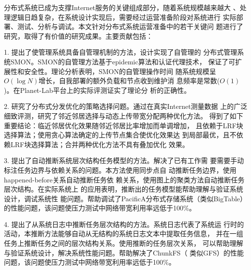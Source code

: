 \begin{cabstract}


  分布式系统已成为支撑Internet服务的关键组成部分，随着系统规模越来越大
  、处理逻辑日趋复杂，在系统设计实现后，需要经过运营准备阶段对系统进行
  实际部署、测试、分析与调试。本文针对分布式系统运营准备中的若干关键问
  题进行了研究，取得了有价值的研究成果。主要贡献包括：

    1. 提出了使管理系统具备自管理机制的方法，设计实现了自管理的
    分布式管理系统SMON。SMON的自管理方法基于epidemic算法和认证代理技术，
    保证了可扩展性和安全性。理论分析表明，SMON的自管理操作时间
    随系统规模呈$O(\log N)$增长，自我部署的额外负载和节点收到维护消
    息频率是常数($O(1)$)。在Planet-Lab平台上的实际评测证实了理论分
    析的正确性。

    2. 研究了分布式分发优化的策略选择问题。通过在真实Internet测量数据
    上的广泛细致评测，研究了邻近邻居选择与动态上传带宽分配两种优化方法。
    得到了如下重要结论：临近邻居优化效果随邻近邻居比率增加而单调增加，
    且依赖于LRF块选择算法；使用贪心算法确定的上传节点集合使优化效果达
    到局部最优，且不依赖LRF块选择算法；合并两种优化方法不具有叠加优化
    效果。

    3. 提出了自动推断系统层次结构任务模型的方法。解决了已有工作需
    要需要手动标注任务边界与依赖关系的问题。本方法使用同步点自
    动推断任务边界，使用happened-before关系自动推断任务依
    赖关系，使用图上的聚类方法自动推断任务层次结构。在实际系统上
    的应用表明，推断出的任务模型能帮助理解与验证系统设计，调试系统性
    能问题。帮助调试了PacificA分布式存储系统（类似BigTable）
    的性能问题，该问题使压力测试中网络带宽利用率远低于100\%。

    4. 提出了从系统日志中推断任务层次结构的方法。系统日志代表了系统运
    行时的活动，本推断方法能够自动从无结构的系统日志文本中提取任务信息，
    并在一组任务上推断任务之间的层次结构关系。使用推断的任务层次关系，
    可以帮助理解与验证系统设计，解决系统性能问题。帮助解决了ChunkFS（
    类似GFS）的性能问题，该问题使压力测试中网络带宽利用率远低于100\%。


\end{cabstract}


